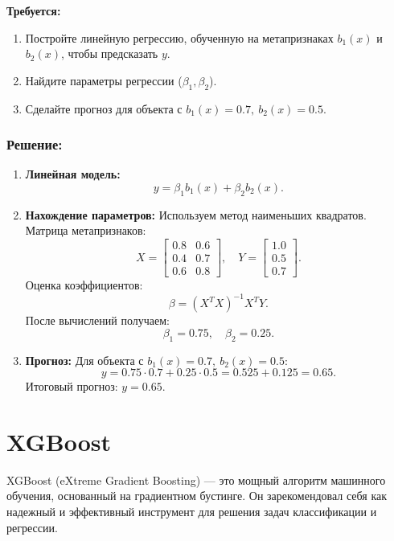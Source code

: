 \textbf{Требуется:}
\begin{enumerate}
    \item Постройте линейную регрессию, обученную на метапризнаках $b_1(x)$ и $b_2(x)$, чтобы предсказать $y$.
    \item Найдите параметры регрессии ($\beta_1, \beta_2$).
    \item Сделайте прогноз для объекта с $b_1(x) = 0.7, \ b_2(x) = 0.5$.
\end{enumerate}

\subsubsection*{Решение:}
\begin{enumerate}
    \item \textbf{Линейная модель:}
          \[
              y = \beta_1 b_1(x) + \beta_2 b_2(x).
          \]

    \item \textbf{Нахождение параметров:}
          Используем метод наименьших квадратов. Матрица метапризнаков:
          \[
              X = \begin{bmatrix}
                  0.8 & 0.6 \\
                  0.4 & 0.7 \\
                  0.6 & 0.8
              \end{bmatrix}, \quad Y = \begin{bmatrix}
                  1.0 \\
                  0.5 \\
                  0.7
              \end{bmatrix}.
          \]
          Оценка коэффициентов:
          \[
              \beta = (X^T X)^{-1} X^T Y.
          \]
          После вычислений получаем:
          \[
              \beta_1 = 0.75, \quad \beta_2 = 0.25.
          \]

    \item \textbf{Прогноз:}
          Для объекта с $b_1(x) = 0.7, \ b_2(x) = 0.5$:
          \[
              y = 0.75 \cdot 0.7 + 0.25 \cdot 0.5 = 0.525 + 0.125 = 0.65.
          \]
          Итоговый прогноз: $y = 0.65$.
\end{enumerate}

\section{XGBoost}
XGBoost (eXtreme Gradient Boosting) — это мощный алгоритм машинного обучения, основанный на градиентном бустинге. Он зарекомендовал себя как надежный и эффективный инструмент для решения задач классификации и регрессии.

